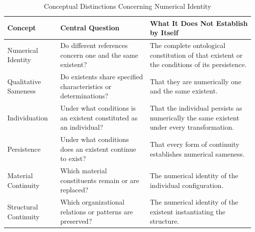 %
%
%
%

\begin{table}[htbp]
\centering
\caption{Conceptual Distinctions Concerning Numerical Identity}
\label{tab:numerical-identity-persistence-distinctions}

\small
\renewcommand{\arraystretch}{1.3}

\begin{tabular}{|p{}|p{}|p{}|}
\hline
\textbf{Concept}
&
\textbf{Central Question}
&
\textbf{What It Does Not Establish by Itself}
\\
\hline

Numerical Identity
&
Do different references concern one and the same existent?
&
The complete ontological constitution of that existent or the conditions of its persistence.
\\
\hline

Qualitative Sameness
&
Do existents share specified characteristics or determinations?
&
That they are numerically one and the same existent.
\\
\hline

Individuation
&
Under what conditions is an existent constituted as an individual?
&
That the individual persists as numerically the same existent under every transformation.
\\
\hline

Persistence
&
Under what conditions does an existent continue to exist?
&
That every form of continuity establishes numerical sameness.
\\
\hline

Material Continuity
&
Which material constituents remain or are replaced?
&
The numerical identity of the individual configuration.
\\
\hline

Structural Continuity
&
Which organizational relations or patterns are preserved?
&
The numerical identity of the existent instantiating the structure.
\\
\hline


\end{tabular}
\end{table}
